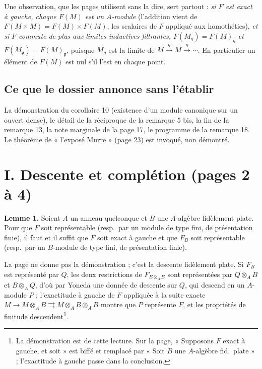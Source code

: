 \documentclass[11pt,a4paper]{article}
\begin{document}
Une observation, que les pages utilisent sans la dire, sert partout : \emph{si
$F$ est exact à gauche, chaque $F(M)$ est un $A$-module} (l'addition vient de
$F(M \times M) = F(M) \times F(M)$, les scalaires de $F$ appliqué aux
homothéties), \emph{et si $F$ commute de plus aux limites inductives
filtrantes, $F(M_g) = F(M)_g$ et $F(M_{\mathfrak{p}}) = F(M)_{\mathfrak{p}}$},
puisque $M_g$ est la limite de $M \xrightarrow{g} M \xrightarrow{g} \cdots$.
En particulier un élément de $F(M)$ est nul s'il l'est en chaque point.

\subsection*{Ce que le dossier annonce sans l'établir}

La démonstration du corollaire 10 (existence d'un module canonique sur un
ouvert dense), le détail de la réciproque de la remarque 5 bis, la fin de la
remarque 13, la note marginale de la page 17, le programme de la remarque 18.
Le théorème de « l'exposé Murre » (page 23) est invoqué, non démontré.

\section*{I. Descente et complétion (pages 2 à 4)}

\textbf{Lemme 1.} Soient $A$ un anneau quelconque et $B$ une $A$-algèbre
fidèlement plate. Pour que $F$ soit représentable (resp.\ par un module de type
fini, de présentation finie), il faut et il suffit que $F$ soit exact à gauche
et que $F_B$ soit représentable (resp.\ par un $B$-module de type fini, de
présentation finie).

La page ne donne pas la démonstration ; c'est la descente fidèlement plate.
Si $F_B$ est représenté par $Q$, les deux restrictions de $F_{B \otimes_A B}$
sont représentées par $Q \otimes_A B$ et $B \otimes_A Q$, d'où par Yoneda une
donnée de descente sur $Q$, qui descend en un $A$-module $P$ ; l'exactitude à
gauche de $F$ appliquée à la suite exacte
$M \to M \otimes_A B \rightrightarrows M \otimes_A B \otimes_A B$ montre que $P$
représente $F$, et les propriétés de finitude descendent\footnote{La
démonstration est de cette lecture. Sur la page, « Supposons $F$ exact à
gauche, et soit » est biffé et remplacé par « Soit $B$ une $A$-algèbre fid.\
plate » ; l'exactitude à gauche passe dans la conclusion.}.
\end{document}
